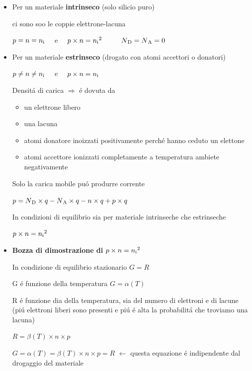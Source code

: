 \documentclass{article}
\begin{document}
\begin{itemize}
    \item Per un materiale \textbf{intrinseco} (solo silicio puro)

        ci sono soo le coppie elettrone-lacuna

        $p=n=n\textsubscript{i}\quad$ e $\quad p \times n = n\textsubscript{i}^2$ $\qquad$ $N\textsubscript{D} = N\textsubscript{A} = 0$

    \item Per un materiale \textbf{estrinseco} (drogato con atomi accettori o donatori)

        $p \neq n \neq n\textsubscript{i} \quad$ e $\quad p \times n = n\textsubscript{i}$

        Densit\'a di carica $\Rightarrow$ \'e dovuta da
        \begin{itemize}
            \item un elettrone libero
            \item una lacuna
            \item atomi donatore inoizzati positivamente perch\'e hanno ceduto un elettone
            \item atomi accettore ionizzati completamente a temperatura ambiete negativamente
        \end{itemize}

        Solo la carica mobile pu\'o produrre corrente

        $p = N\textsubscript{D} \times q - N\textsubscript{A} \times q - n \times q + p \times q$

        In condizioni di equilibrio sia per materiale intrinseche che estrinseche

        $p \times n = n\textsubscript{i}^2$

    \item \textbf{Bozza di dimostrazione di} $p\times n = n\textsubscript{i}^2$

        In condizione di equilibrio stazionario $G=R$

        G \'e funzione della temperatura $G = \alpha (T)$

        R \'e funzione dia della temperatura, sia del numero di elettroni e di lacune (pi\'u elettroni liberi sono presenti e pi\'u \'e alta la probabilit\'a che troviamo una lacuna)

        $R = \beta (T) \times n \times p$

        $G = \alpha (T) = \beta (T) \times n \times p = R$ $\leftarrow$ questa equazione \'e indipendente dal drogaggio del materiale

\end{itemize}
\end{document}
